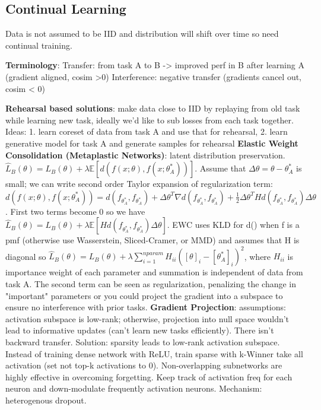\subsection*{Continual Learning}


Data is not assumed to be IID and distribution will shift over time so need continual training. 

\textbf{Terminology}: 
Transfer: from task A to B -> improved perf in B after learning A (gradient aligned, cosim >0)
Interference: negative transfer (gradients cancel out, cosim < 0)

\textbf{Rehearsal based solutions}: 
make data close to IID by replaying from old task while learning new task, ideally we'd like to sub losses from each task together. Ideas: 1. learn coreset of data from task A and use that for rehearsal, 2. learn generative model for task A and generate samples for rehearsal 
\textbf{Elastic Weight Consolidation (Metaplastic Networks)}: latent distribution preservation. $\hat L_{B}(\theta) = L_{B}(\theta) + \lambda \mathbb{E}[d(f(x; \theta), f(x; \theta_{A}^{*}))]$. Assume that $\Delta \theta = \theta - \theta_{A}^{*}$ is small; we can write second order Taylor expansion of regularization term: $d(f(x; \theta), f(x; \theta_{A}^{*})) = d(f_{\theta_{A}^{*}}, f_{\theta_{A}^{*}}) + \Delta \theta^{T}\nabla d(f_{\theta_{A}^{*}}, f_{\theta_{A}^{*}}) + \frac{1}{2} \Delta \theta^{T}Hd(f_{\theta_{A}^{*}}, f_{\theta_{A}^{*}})\Delta \theta$. First two terms become 0 so we have $\hat L_{B}(\theta) = L_{B}(\theta) + \lambda \mathbb{E}[Hd(f_{\theta_{A}^{*}}, f_{\theta_{A}^{*}})\Delta \theta]$. EWC uses KLD for d() when f is a pmf (otherwise use Wasserstein, Sliced-Cramer, or MMD) and assumes that H is diagonal so $\hat L_{B}(\theta) = L_{B}(\theta) + \lambda \sum\limits_{i=1}^{nparam}H_{ii}([\theta]_{i} - [\theta_{A}^{*}]_{i})^{2}$, where $H_{ii}$ is importance weight of each parameter and summation is independent of data from task A.  The second term can be seen as regularization, penalizing the change in "important" parameters or you could project the gradient into a subspace to ensure no interference with prior tasks. 
\textbf{Gradient Projection}: assumptions: activation subspace is low-rank; otherwise, projection into null space wouldn't lead to informative updates (can't learn new tasks efficiently). There isn't backward transfer. Solution: sparsity leads to low-rank activation subspace. Instead of training dense network with ReLU, train sparse with k-Winner take all activation (set not top-k activations to 0). 
Non-overlapping subnetworks are highly effective in overcoming forgetting. Keep track of activation freq for each neuron and down-modulate frequently activation neurons. Mechanism: heterogenous dropout. 
